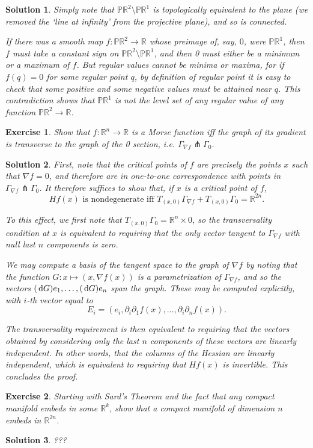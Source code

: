 \documentclass{article}
\newtheorem{ex}{Exercise}
\theoremstyle{nonumberplain}
\newtheorem{sol}{Solution}
\newcommand{\R}{\mathbb{R}}
\newcommand{\PP}{\mathbb{P}}
\newcommand{\grad}{\nabla}
\begin{document}
\begin{sol}
Simply note that $\PP\R^2 \setminus \PP\R^1$ is topologically equivalent to the plane (we removed the `line at infinity' from the projective plane), and so is connected.

If there was a smooth map $f \colon \PP\R^2 \to \R$ whose preimage of, say, $0$, were $\PP\R^1$, then $f$ must take a constant sign on $\PP\R^2 \setminus \PP\R^1$, and then 0 must either be a minimum or a maximum of $f$. But regular values cannot be minima or maxima, for if $f(q) = 0$ for some regular point $q$, by definition of regular point it is easy to check that some positive and some negative values must be attained near $q$. This contradiction shows that $\PP\R^1$ is not the level set of any regular value of any function $\PP\R^2 \to \R$.
\end{sol}

\begin{ex}
Show that $f \colon \R^n \to \R$ is a Morse function iff the graph of its gradient is transverse to the graph of the 0 section, i.e. $\Gamma_{\grad f} \pitchfork \Gamma_0$.
\end{ex}

\begin{sol}
First, note that the critical points of $f$ are precisely the points $x$ such that $\grad f = 0$, and therefore are in one-to-one correspondence with points in $\Gamma_{\grad f} \pitchfork \Gamma_0$. It therefore suffices to show that, if $x$ is a critical point of $f$,
\[Hf(x) \text{ is nondegenerate iff } T_{(x,0)} \Gamma_{\grad f} + T_{(x,0)} \Gamma_0 = \R^{2n}.\]

To this effect, we first note that $T_{(x,0)} \Gamma_0 = \R^n \times 0$, so the transversality condition at $x$ is equivalent to requiring that the only vector tangent to $\Gamma_{\grad f}$ with null last $n$ components is zero.

We may compute a basis of the tangent space to the graph of $\grad f$ by noting that the function $G \colon x \mapsto (x, \grad f(x))$ is a parametrization of $\Gamma_{\grad f}$, and so the vectors $(\dl G) e_1, \dots, (\dl G) e_n$ span the graph. These may be computed explicitly, with $i$-th vector equal to
\[E_i = (e_i, \partial_i \partial_1 f(x), \dots, \partial_i \partial_n f(x)).\]

The transversality requirement is then equivalent to requiring that the vectors obtained by considering only the last $n$ components of these vectors are linearly independent. In other words, that the columns of the Hessian are linearly independent, which is equivalent to requiring that $Hf(x)$ is invertible. This concludes the proof.
\end{sol}

\begin{ex}
Starting with Sard's Theorem and the fact that any compact manifold embeds in some $\R^k$, show that a compact manifold of dimension $n$ embeds in $\R^{2n}$.
\end{ex}

\begin{sol}
???
\end{sol}
\end{document}
